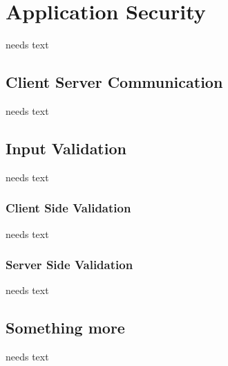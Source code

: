 \documentclass[a4paper,10pt,twoside]{book}
\begin{document}
  \sloppy
\fi


\chapter{Application Security}
needs text

\section{Client Server Communication}
needs text

\section{Input Validation}
needs text

\subsection{Client Side Validation}
needs text

\subsection{Server Side Validation}
needs text

\section{Something more}
needs text


\ifx\wholebook\relax\else
   
   
\end{document}
